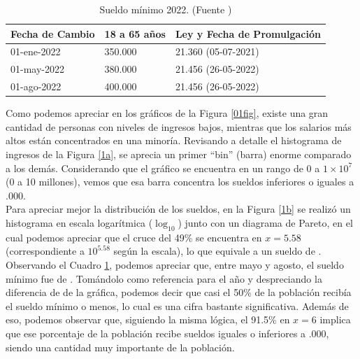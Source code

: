 \documentclass{article}
\begin{document}
	\begin{table}[htbp]
		\centering
		\begin{tabularx}{\textwidth}{|X|X|X|}
			\hline
			Fecha de Cambio & 18 a 65 años & Ley y Fecha de Promulgación\\
			\hline
			01-ene-2022 & 350.000 & 21.360 (05-07-2021) \\\hline
			01-may-2022 & 380.000 & 21.456 (26-05-2022) \\\hline
			01-ago-2022 & 400.000 & 21.456 (26-05-2022) \\\hline
		\end{tabularx}
		\caption{\label{tab} Sueldo mínimo 2022. (Fuente \cite{cyma})}
	\end{table}
		
	\FloatBarrier
	
	Como podemos apreciar en los gráficos de la Figura \ref{01fig}, existe una gran cantidad de personas con niveles de ingresos bajos, mientras que los salarios más altos están concentrados en una minoría. Revisando a detalle el histograma de ingresos de la Figura \ref{1a}, se aprecia un primer “bin” (barra) enorme comparado a los demás. Considerando que el gráfico se encuentra en un rango de $0$ a $1\times10^{7}$ (0 a 10 millones), vemos que esa barra concentra los sueldos inferiores o iguales a .000.\\
	
	Para apreciar mejor la distribución de los sueldos, en la Figura \ref{1b} se realizó un histograma en escala logarítmica (\(\log_{10}\)) junto con un diagrama de Pareto, en el cual podemos apreciar que el cruce del 49\% se encuentra en $x=5.58$ (correspondiente a $10^{5.58}$ según la escala), lo que equivale a un sueldo de .\\
	
	Observando el Cuadro \ref{tab}, podemos apreciar que, entre mayo y agosto, el sueldo mínimo fue de . Tomándolo como referencia para el año y despreciando la diferencia de  de la gráfica, podemos decir que casi el 50\% de la población recibía el sueldo mínimo o menos, lo cual es una cifra bastante significativa. Además de eso, podemos observar que, siguiendo la misma lógica, el 91.5\% en $x=6$ implica que ese porcentaje de la población recibe sueldos iguales o inferiores a .000, siendo una cantidad muy importante de la población.
	
	\FloatBarrier
	
\end{document}
